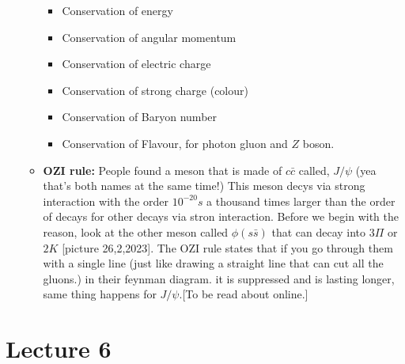 \documentclass[10pt,a4paper]{article}
\begin{document}
\begin{itemize}
\begin{itemize}
\begin{itemize}
                         \item Conservation of energy
                         \item Conservation of angular momentum
                         \item Conservation of electric charge
                         \item Conservation of strong charge (colour)
                         \item Conservation of Baryon number
                         \item Conservation of Flavour, for photon gluon and $Z$ boson.
                    \end{itemize}
                    \item \textbf{OZI rule:} People found a meson that is made of $c\bar c$  called, $J/\psi$ (yea that's both names at the same time!) This meson decys via strong interaction with the order $10^{-20}s$ a thousand times larger than the order of decays for other decays via stron interaction. Before we begin with the reason, look at the other meson called $\phi (s\bar s)$ that can decay into $3\Pi$ or $2K$ [picture 26,2,2023].
                    The OZI rule states that if you go through them with a single line (just like drawing a straight line that can cut all the gluons.) in their feynman diagram. it is suppressed and is lasting longer, same thing happens for $J/\psi$.[To be read about online.]
               \end{itemize}
          \end{itemize}
     \section{Lecture 6}
          
\end{document}
